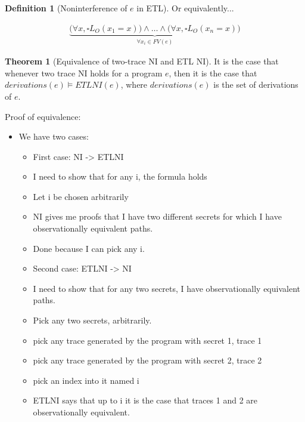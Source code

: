 \documentclass{sig-alternate}
\theoremstyle{definition}
\newtheorem{defn}{Definition}[section]
\newtheorem{thm}{Theorem}[section]
\newcommand{\talways}{\square}
\begin{document}
{\begin{defn}[Noninterference of $e$ in ETL]
  Or equivalently...

  \begin{displaymath}
    \begin{array}{c}
      \underbrace{\big(\forall x, \talways L_O(x_1 = x)\big) \wedge \ldots \wedge
        \big(\forall x, \talways L_O(x_n = x)\big)}_{\forall x_i \in FV(e)}
    \end{array}
  \end{displaymath}
\end{defn}

\begin{thm}[Equivalence of two-trace NI and ETL NI]
  It is the case that whenever two trace NI holds for a program $e$,
  then it is the case that $derivations(e) \models ETLNI(e)$, where
  $derivations(e)$ is the set of derivations of $e$.
\end{thm}

Proof of equivalence:

\begin{itemize}
\item We have two cases:
  \begin{itemize}
  \item First case: NI -> ETLNI
  \item I need to show that for any i, the formula holds
  \item Let i be chosen arbitrarily
  \item NI gives me proofs that I have two different secrets for which
    I have observationally equivalent paths.
  \item Done because I can pick any i.
  \end{itemize}
  \begin{itemize}
  \item Second case: ETLNI -> NI
  \item I need to show that for any two secrets, I have
    observationally equivalent paths.
  \item Pick any two secrets, arbitrarily.
  \item pick any trace generated by the program with secret 1, trace 1
  \item pick any trace generated by the program with secret 2, trace 2
  \item pick an index into it named i
  \item ETLNI says that up to i it is the case that traces 1 and 2 are
    observationally equivalent.
  \end{itemize}
\end{itemize}

}
\end{document}
